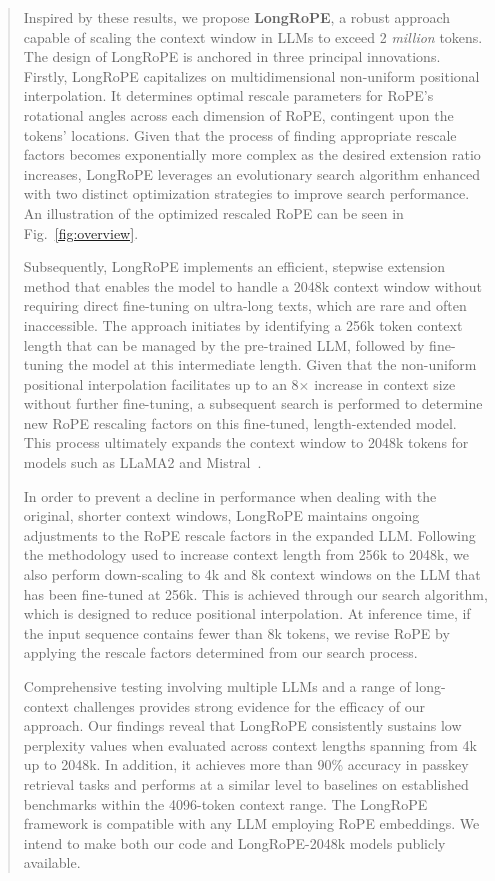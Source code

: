 \begin{abstract}
Inspired by these results, we propose \textbf{LongRoPE}, a robust approach capable of scaling the context window in LLMs to exceed 2 \emph{million} tokens. The design of LongRoPE is anchored in three principal innovations. Firstly, {LongRoPE} capitalizes on multidimensional non-uniform positional interpolation. It determines optimal rescale parameters for RoPE's rotational angles across each dimension of RoPE, contingent upon the tokens’ locations. Given that the process of finding appropriate rescale factors becomes exponentially more complex as the desired extension ratio increases, {LongRoPE} leverages an evolutionary search algorithm enhanced with two distinct optimization strategies to improve search performance. An illustration of the optimized rescaled RoPE can be seen in Fig.~\ref{fig:overview}.

Subsequently, {LongRoPE} implements an efficient, stepwise extension method that enables the model to handle a 2048k context window without requiring direct fine-tuning on ultra-long texts, which are rare and often inaccessible. The approach initiates by identifying a 256k token context length that can be managed by the pre-trained LLM, followed by fine-tuning the model at this intermediate length. Given that the non-uniform positional interpolation facilitates up to an 8$\times$ increase in context size without further fine-tuning, a subsequent search is performed to determine new RoPE rescaling factors on this fine-tuned, length-extended model. This process ultimately expands the context window to 2048k tokens for models such as LLaMA2 and Mistral~\cite{mistral}.

In order to prevent a decline in performance when dealing with the original, shorter context windows, {LongRoPE} maintains ongoing adjustments to the RoPE rescale factors in the expanded LLM. Following the methodology used to increase context length from 256k to 2048k, we also perform down-scaling to 4k and 8k context windows on the LLM that has been fine-tuned at 256k. This is achieved through our search algorithm, which is designed to reduce positional interpolation. At inference time, if the input sequence contains fewer than 8k tokens, we revise RoPE by applying the rescale factors determined from our search process.

Comprehensive testing involving multiple LLMs and a range of long-context challenges provides strong evidence for the efficacy of our approach. Our findings reveal that LongRoPE consistently sustains low perplexity values when evaluated across context lengths spanning from 4k up to 2048k. In addition, it achieves more than 90\% accuracy in passkey retrieval tasks and performs at a similar level to baselines on established benchmarks within the 4096-token context range. The LongRoPE framework is compatible with any LLM employing RoPE embeddings. We intend to make both our code and LongRoPE-2048k models publicly available.


\end{abstract}
